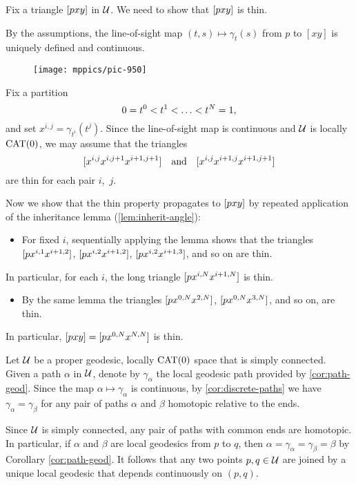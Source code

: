 Fix a triangle $[pxy]$  in $\mathcal{U}$. 
We need to show that $[pxy]$ is thin.

By the assumptions, the line-of-sight map  $(t,s)\mapsto\gamma_t(s)$ from $p$ to   $[x y]$ is uniquely defined and continuous.    


\begin{figure}[ht!]
\vskip0mm
\centering
\texttt{[image: mppics/pic-950]}
\end{figure}

Fix  a partition \[0\z=t^0\z<t^1\z<\z\dots\z<t^N=1,\] 
and set $x^{i,j}=\gamma_{t^i}(t^j)$. 
Since the line-of-sight map is continuous and $\mathcal{U}$ is locally $\mathrm{CAT}(0)$, we may assume that the triangles 
\[[x^{i,j}x^{i,j+1}x^{i+1,j+1}]\quad\text{and}\quad[x^{i,j}x^{i+1,j}x^{i+1,j+1}]\] 
are thin for each pair $i$,~$j$.

Now we show that the thin property propagates to $[pxy]$ by repeated application of the inheritance lemma (\ref{lem:inherit-angle}):
\begin{itemize}
\item 
For fixed $i$, 
sequentially applying the lemma shows that the triangles 
$[px^{i,1}x^{i+1,2}]$, 
$[px^{i,2}x^{i+1,2}]$, 
$[px^{i,2}x^{i+1,3}]$,
and so on are thin. 
\end{itemize}
In particular, for each $i$, the long triangle $[px^{i,N}x^{i+1,N}]$ is thin.
\begin{itemize} 
\item 
By the same lemma the  triangles $[px^{0,N}x^{2,N}]$, $[px^{0,N}x^{3,N}]$, and so on, are thin. 
\end{itemize}
In particular, $[pxy]=[px^{0,N}x^{N,N}]$ is thin.
\qeds

Let $\mathcal{U}$ be a proper geodesic, locally $\mathrm{CAT}(0)$ space that is simply connected.
Given a path $\alpha$ in $\mathcal{U}$, 
denote by $\gamma_\alpha$ the local geodesic path provided by \ref{cor:path-geod}.
Since the map $\alpha\mapsto\gamma_\alpha$ is continuous, by \ref{cor:discrete-paths}
we have $\gamma_\alpha=\gamma_\beta$ for any pair of  paths $\alpha$ and $\beta$  homotopic relative to the ends.

Since $\mathcal{U}$ is simply connected, any pair of paths with common ends are homotopic.  In particular, if $\alpha$ and $\beta$ are local geodesics from $p$ to $q$, then $\alpha =\gamma_\alpha=\gamma_\beta=\beta$ by Corollary \ref{cor:path-geod}.
It follows that any two points $p,q\in\mathcal{U}$ are joined by a unique local geodesic that depends continuously on $(p,q)$.


